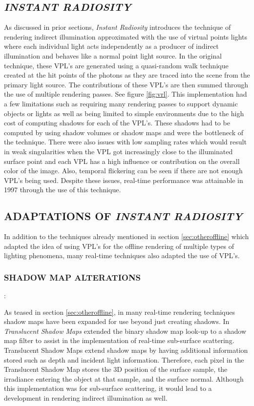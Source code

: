 \subsection{\textit{INSTANT RADIOSITY}} \label{sec:instantradiosity}

As discussed in prior sections, \textit{Instant Radiosity} introduces the technique of rendering indirect illumination approximated with the use of virtual points lights where each individual light acts independently as a producer of indirect illumination and behaves like a normal point light source.  In the original technique, these VPL's are generated using a quasi-random walk technique created at the hit points of the photons as they are traced into the scene from the primary light source.  The contributions of these VPL's are then summed through the use of multiple rendering passes.  See figure \ref{fig:vrl}. This implementation had a few limitations such as requiring many rendering passes to support dynamic objects or lights as well as being limited to simple environments due to the high cost of computing shadows for each of the VPL's.  These shadows had to be computed by using shadow volumes or shadow maps and were the bottleneck of the technique.  There were also issues with low sampling rates which would result in weak singularities when the VPL got increasingly close to the illuminated surface point and each VPL has a high influence or contribution on the overall color of the image.  Also, temporal flickering can be seen if there are not enough VPL's being used.  Despite these issues, real-time performance was attainable in 1997 through the use of this technique.

\subsection{ADAPTATIONS OF \textit{INSTANT RADIOSITY}}

In addition to the techniques already mentioned in section \ref{sec:otheroffline} which adapted the idea of using VPL's for the offline rendering of multiple types of lighting phenomena, many real-time techniques also adapted the use of VPL's.  

\subsubsection{SHADOW MAP ALTERATIONS}: 

As teased in section \ref{sec:otheroffline}, in many real-time rendering techniques shadow maps have been expanded for use beyond just creating shadows.  In \textit{Translucent Shadow Maps} \cite{Dachsbacher2003} extended the binary shadow map look-up to a shadow map filter to assist in the implementation of real-time sub-surface scattering.  Translucent Shadow Maps extend shadow maps by having additional information stored such as depth and incident light information.  Therefore, each pixel in the Translucent Shadow Map stores the 3D position of the surface sample, the irradiance entering the object at that sample, and the surface normal.  Although this implementation was for sub-surface scattering, it would lead to a development in rendering indirect illumination as well.

